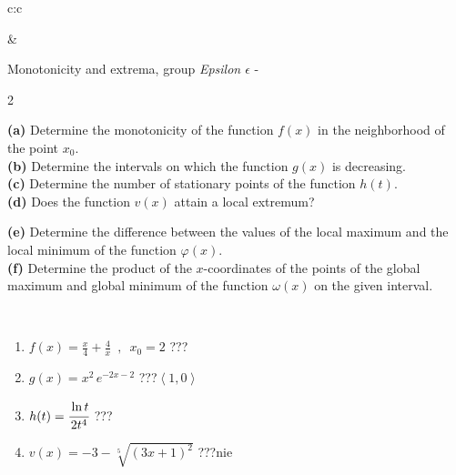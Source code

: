 \documentclass[10pt]{report}
\begin{document}
\begin{tabular}{c:c}
\begin{minipage}[c][104.5mm][t]{0.5\linewidth}
\begin{center}
\end{center}
\end{minipage}
&
\begin{minipage}[c][104.5mm][t]{0.5\linewidth}
\begin{center}
\vspace{5mm}
{\huge Monotonicity and extrema, group \textit{Epsilon $\epsilon$} -}\\[5mm]
\begin{minipage}{0.95\linewidth}
\begin{center}
{\small \begin{multicols}{2} \raggedright
\textbf{(a)} Determine the monotonicity of the function \(f(x)\) in the neighborhood of the point \(x_0\). \\[1mm]
\textbf{(b)} Determine the intervals on which the function \(g(x)\) is decreasing. \\[1mm]
\textbf{(c)} Determine the number of stationary points of the function \(h(t)\). \\[1mm]
\textbf{(d)} Does the function \(v(x)\) attain a local extremum? \par \columnbreak
\textbf{(e)} Determine the difference between the values of the local maximum and the local minimum of the function \(\varphi(x)\). \\[1mm]
\textbf{(f)} Determine the product of the \(x\)-coordinates of the points of the global maximum and global minimum of the function \(\omega(x)\) on the given interval. \\[1mm]
\end{multicols}
}
\end{center}
\end{minipage}
\\[1mm]
\begin{minipage}{0.79\linewidth}
\begin{center}
\begin{varwidth}{\linewidth}
\setlength{\itemsep}{0pt}
\begin{enumerate}
\normalsize
\item $f(x)=\frac{x}{4}+\frac{4}{x} \enspace , \enspace x_0=2$\quad \dotfill\; ???\;\dotfill \quad {}
\item $g(x)=x^2\, e^{-2x-2}$\quad \dotfill\; ???\;\dotfill \quad $\left\langle1 , 0\right\rangle$
\item $h(t)=\cfrac{\ln t}{2t^4}$\quad \dotfill\; ???\;\dotfill {}
\item $v(x)=-3-\sqrt[5]{(3x+1)^2}$\quad \dotfill\; ???\;\dotfill \quad $\text{nie}$

\end{enumerate}
\end{varwidth}
\end{center}
\end{minipage}
\end{center}
\end{minipage}
\end{tabular}
\end{document}
